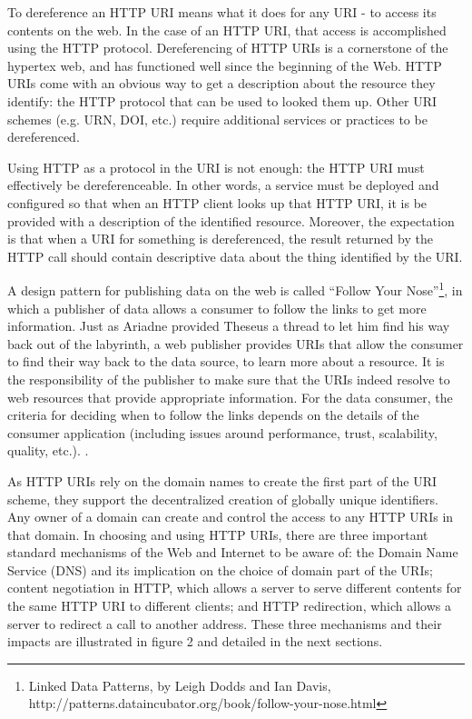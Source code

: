 To dereference an HTTP URI means what it does for any URI - to access its contents on the web. 
In the case of an HTTP URI, that access is accomplished  using the HTTP
protocol.  Dereferencing of HTTP URIs is a cornerstone of the hypertex web, and has
functioned well since the beginning of the Web. HTTP URIs come with an
obvious way to get a description about the resource they identify: the
HTTP protocol that can be used to looked them up. Other URI schemes
(e.g. URN, DOI, etc.) require additional services or practices to be
dereferenced.

Using HTTP as a protocol in the URI is not enough: the HTTP URI must
effectively be dereferenceable. In other words, a service must be
deployed and configured so that when an HTTP client looks up that HTTP
URI, it is be provided with a description of the identified resource.
Moreover, the expectation is that when a URI for something is
dereferenced, the result returned by the HTTP call should contain
descriptive data about the thing identified by the URI.

A design pattern for publishing data on the web is called ``Follow Your
Nose''\footnote{Linked Data Patterns, by Leigh Dodds and Ian Davis,
  http://patterns.dataincubator.org/book/follow-your-nose.html}, in
which a publisher of data allows a consumer to follow the links to get
more information. Just as Ariadne provided Theseus a thread to let him
find his way back out of the labyrinth, a web publisher provides URIs
that allow the consumer to find their way back to the data source, to
learn more about a resource. It is the responsibility of the publisher
to make sure that the URIs indeed resolve to web resources that provide
appropriate information. For the data consumer, the criteria for
deciding when to follow the links depends on the details of the consumer
application (including issues around performance, trust, scalability,
quality, etc.). .

As HTTP URIs rely on the domain names to create the first part of the
URI scheme, they support the decentralized creation of globally unique
identifiers. Any owner of a domain can create and control the access to
any HTTP URIs in that domain. In choosing and using HTTP URIs, there are
three important standard mechanisms of the Web and Internet to be aware
of: the Domain Name Service (DNS) and its implication on the choice of
domain part of the URIs; content negotiation in HTTP, which allows a
server to serve different contents for the same HTTP URI to different
clients; and HTTP redirection, which allows a server to redirect a call
to another address. These three mechanisms and their impacts are
illustrated in figure 2 and detailed in the next sections.



